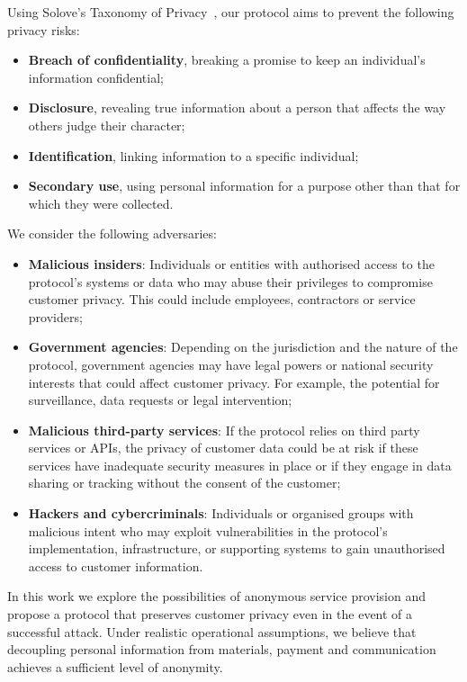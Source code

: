 \documentclass[pdftex,twocolumn,epjc3]{svjour3}
\begin{document}
Using Solove's Taxonomy of Privacy~\cite{soloveTaxonomyPrivacy2006}, our protocol aims to prevent the following privacy risks:
\begin{itemize}
    \item \textbf{Breach of confidentiality}, breaking a promise to keep an individual's information confidential;
    \item \textbf{Disclosure}, revealing true information about a person that affects the way others judge their character;
    \item \textbf{Identification}, linking information to a specific individual;
    \item \textbf{Secondary use}, using personal information for a purpose other than that for which they were collected.
\end{itemize}

We consider the following adversaries:
\begin{itemize}
    \item \textbf{Malicious insiders}: Individuals or entities with authorised access to the protocol's systems or data who may abuse their privileges to compromise customer privacy. This could include employees, contractors or service providers;
    \item \textbf{Government agencies}: Depending on the jurisdiction and the nature of the protocol, government agencies may have legal powers or national security interests that could affect customer privacy. For example, the potential for surveillance, data requests or legal intervention;
    \item \textbf{Malicious third-party services}: If the protocol relies on third party services or APIs, the privacy of customer data could be at risk if these services have inadequate security measures in place or if they engage in data sharing or tracking without the consent of the customer;
    \item \textbf{Hackers and cybercriminals}: Individuals or organised groups with malicious intent who may exploit vulnerabilities in the protocol's implementation, infrastructure, or supporting systems to gain unauthorised access to customer information.
\end{itemize}

In this work we explore the possibilities of anonymous service provision and propose a protocol that preserves customer privacy even in the event of a successful attack. Under realistic operational assumptions, we believe that decoupling personal information from materials, payment and communication achieves a sufficient level of anonymity.
\end{document}
